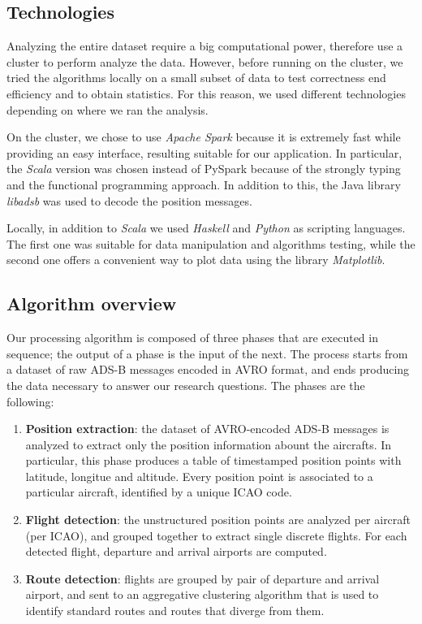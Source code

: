 \documentclass{vldb}
\begin{document}
\subsection{Technologies}

Analyzing the entire dataset require a big computational power, therefore use a cluster to perform analyze the data. However, before running on the cluster, we tried the algorithms locally on a small subset of data to test correctness end efficiency and to obtain statistics. For this reason, we used different technologies depending on where we ran the analysis.

On the cluster, we chose to use \textit{Apache Spark} because it is extremely fast while providing an easy interface, resulting suitable for our application. In particular, the \textit{Scala} version was chosen instead of PySpark because of the strongly typing and the functional programming approach. In addition to this, the Java library \textit{libadsb} was used to decode the position messages.

Locally, in addition to \textit{Scala} we used \textit{Haskell} and \textit{Python} as scripting languages. The first one was suitable for data manipulation and algorithms testing, while the second one offers a convenient way to plot data using the library \textit{Matplotlib}.

\subsection{Algorithm overview}

Our processing algorithm is composed of three phases that are executed in
sequence; the output of a phase is the input of the next. The process starts
from a dataset of raw ADS-B messages encoded in AVRO format, and ends producing
the data necessary to answer our research questions. The phases are the
following:

\begin{enumerate}
  \item \textbf{Position extraction}: the dataset of AVRO-encoded ADS-B messages
  is analyzed to extract only the position information abount the aircrafts. In
  particular, this phase produces a table of timestamped position points with
  latitude, longitue and altitude. Every position point is associated to a
  particular aircraft, identified by a unique ICAO code.
  \item \textbf{Flight detection}: the unstructured position points are analyzed
  per aircraft (per ICAO), and grouped together to extract single discrete
  flights. For each detected flight, departure and arrival airports are
  computed.
  \item \textbf{Route detection}: flights are grouped by pair of departure and
  arrival airport, and sent to an aggregative clustering algorithm that is used
  to identify standard routes and routes that diverge from them.
\end{enumerate}
\end{document}
